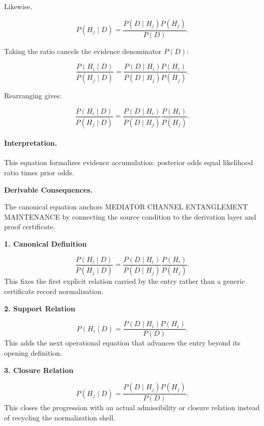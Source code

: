 Likewise,

\begin{equation}
P(H_j\mid D)
=
\frac{P(D\mid H_j)P(H_j)}
{P(D)} .
\end{equation}

Taking the ratio cancels the evidence denominator $P(D)$:

\begin{equation}
\frac{P(H_i\mid D)}
{P(H_j\mid D)}
=
\frac{P(D\mid H_i)P(H_i)}
{P(D\mid H_j)P(H_j)} .
\end{equation}

Rearranging gives:

\begin{equation}
\boxed{
\frac{P(H_i\mid D)}
{P(H_j\mid D)}
=
\frac{P(D\mid H_i)}
{P(D\mid H_j)}
\frac{P(H_i)}
{P(H_j)} .
}
\end{equation}

\paragraph{Interpretation.}
This equation formalizes evidence accumulation: posterior odds equal likelihood ratio times prior odds.

\par\vspace{0.35em}
\noindent\textbf{Derivable Consequences.}\quad
\begingroup
\footnotesize
\raggedright
The canonical equation anchors MEDIATOR CHANNEL ENTANGLEMENT MAINTENANCE by connecting the source condition to the derivation layer and proof certificate.
\par\endgroup

\noindent\textbf{1. Canonical Definition}\par
\[
\frac{P(H_i\mid D)} {P(H_j\mid D)} = \frac{P(D\mid H_i)} {P(D\mid H_j)} \frac{P(H_i)} {P(H_j)}.
\]
\noindent This fixes the first explicit relation carried by the entry rather than a generic certificate record normalization.\par
\noindent\textbf{2. Support Relation}\par
\[
P(H_i\mid D) = \frac{P(D\mid H_i)P(H_i)} {P(D)}.
\]
\noindent This adds the next operational equation that advances the entry beyond its opening definition.\par
\noindent\textbf{3. Closure Relation}\par
\[
P(H_j\mid D) = \frac{P(D\mid H_j)P(H_j)} {P(D)}.
\]
\noindent This closes the progression with an actual admissibility or closure relation instead of recycling the normalization shell.\par

